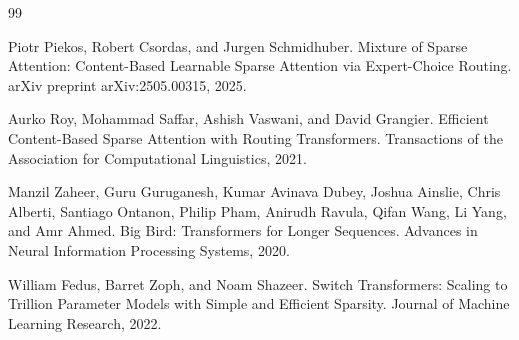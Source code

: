 \documentclass[11pt]{article}
\begin{document}
\begin{thebibliography}{99}

Piotr Piekos, Robert Csordas, and Jurgen Schmidhuber.
\newblock Mixture of Sparse Attention: Content-Based Learnable Sparse Attention via Expert-Choice Routing.
\newblock arXiv preprint arXiv:2505.00315, 2025.

Aurko Roy, Mohammad Saffar, Ashish Vaswani, and David Grangier.
\newblock Efficient Content-Based Sparse Attention with Routing Transformers.
\newblock Transactions of the Association for Computational Linguistics, 2021.

Manzil Zaheer, Guru Guruganesh, Kumar Avinava Dubey, Joshua Ainslie, Chris Alberti, Santiago Ontanon, Philip Pham, Anirudh Ravula, Qifan Wang, Li Yang, and Amr Ahmed.
\newblock Big Bird: Transformers for Longer Sequences.
\newblock Advances in Neural Information Processing Systems, 2020.

William Fedus, Barret Zoph, and Noam Shazeer.
\newblock Switch Transformers: Scaling to Trillion Parameter Models with Simple and Efficient Sparsity.
\newblock Journal of Machine Learning Research, 2022.

\end{thebibliography}
\end{document}
